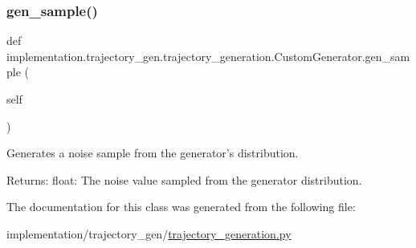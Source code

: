 \subsubsection{\texorpdfstring{gen\+\_\+sample()}{gen\_sample()}}
{\footnotesize\ttfamily def implementation.\+trajectory\+\_\+gen.\+trajectory\+\_\+generation.\+Custom\+Generator.\+gen\+\_\+sample (\begin{DoxyParamCaption}\item[{}]{self }\end{DoxyParamCaption})}

\begin{DoxyVerb}Generates a noise sample from the generator's distribution.

Returns:
    float: The noise value sampled from the generator distribution.
\end{DoxyVerb}
 

The documentation for this class was generated from the following file\+:\begin{DoxyCompactItemize}
\item 
implementation/trajectory\+\_\+gen/\hyperlink{trajectory__generation_8py}{trajectory\+\_\+generation.\+py}\end{DoxyCompactItemize}
